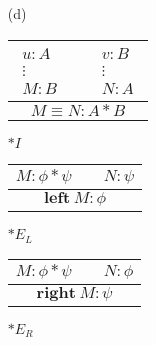 \documentclass[11pt,a4paper]{article}
\begin{document}
\begin{itemize}
\begin{table}[H]
\begin{tabular}{*{10}{l}}
			\cline{3-10}
			
			\vspace{-0.4cm}\\
			
			\cline{3-10}
			
			& $6.$ & \multicolumn{1}{|c}{} & &  & $q$ & $assumption$ & & &\multicolumn{1}{c|}{}\\
			
			& $7.$ & \multicolumn{1}{|c}{} & &  & $p$ & $\supset e \ 3, 6$ & & &\multicolumn{1}{c|}{}\\
			
			\cline{3-10}
			
			& $8.$ & & & & $p * q$ & $* i \ 4$-$5, 6$-$7$ & & & \\
			
		\end{tabular}
		\end{table}

\item[(d)] \



\begin{table}[H]
\centering
\begin{tabular}{ c }
 $\boxed{
\begin{array}{rcl}
u:A \\
\vdots \\
M:B
\end{array}
} \qquad \boxed{
\begin{array}{rcl}
v:B \\
\vdots \\
N:A
\end{array}
} $
\vspace{0.2 cm}\\
 \hline
  $M \equiv N : A * B$
\end{tabular}
$*I$ \qquad
\begin{tabular}{ c }
 $M:\phi * \psi \qquad N:\psi$\\
 \hline
  $\textbf{left} \ M: \phi$
\end{tabular}
$*E_L$ \qquad
\begin{tabular}{ c }
 $M:\phi * \psi \qquad N:\phi$\\
 \hline
  $\textbf{right} \ M:\psi$
\end{tabular}
$*E_R$
\end{table}

		\begin{table}[H]
		\hspace*{-6em}
				\begin{tabular}{*{12}{l}}
			

\end{tabular}
\end{table}
\end{itemize}
\end{document}
